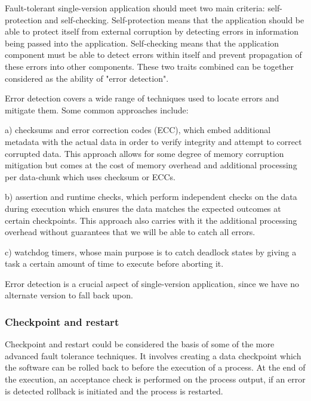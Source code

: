 \documentclass[12pt, letterpaper]{article}
\begin{document}
Fault-tolerant single-version application should meet two main criteria: self-protection and self-checking. Self-protection means that the application should be able to protect itself from external corruption by detecting errors in information being passed into the application. Self-checking means that the application component must be able to detect errors within itself and prevent propagation of these errors into other components. These two traits combined can be together considered as the ability of "error detection".

Error detection covers a wide range of techniques used to locate errors and mitigate them. Some common approaches include:

a) checksums and error correction codes (ECC), which embed additional metadata with the actual data in order to verify integrity and attempt to correct corrupted data. This approach allows for some degree of memory corruption mitigation but comes at the cost of memory overhead and additional processing per data-chunk which uses checksum or ECCs.

b) assertion and runtime checks, which perform independent checks on the data during execution which ensures the data matches the expected outcomes at certain checkpoints. This approach also carries with it the additional processing overhead without guarantees that we will be able to catch all errors.

c) watchdog timers, whose main purpose is to catch deadlock states by giving a task a certain amount of time to execute before aborting it.

Error detection is a crucial aspect of single-version application, since we have no alternate version to fall back upon.

\subsubsection{Checkpoint and restart}

Checkpoint and restart could be considered the basis of some of the more advanced fault tolerance techniques. It involves creating a data checkpoint which the software can be rolled back to before the execution of a process. At the end of the execution, an acceptance check is performed on the process output, if an error is detected rollback is initiated and the process is restarted.
\end{document}
